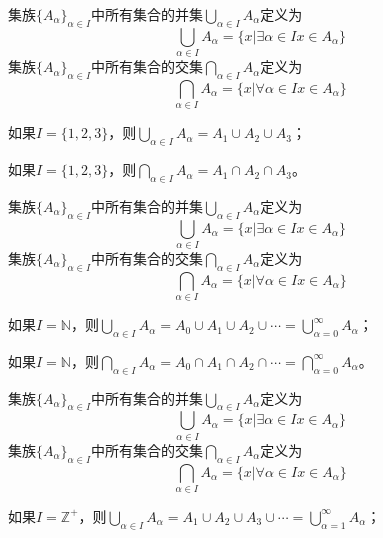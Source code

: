 \documentclass{beamer}
\begin{document}
\begin{CJK*}{UTF8}{gbsn}
\begin{frame}
  集族$\{A_{\alpha}\}_{\alpha \in I}$中所有集合的并集$\bigcup_{\alpha \in I}A_{\alpha}$定义为
  \[ \bigcup_{\alpha \in I}A_{\alpha} = \{x|\exists \alpha \in I  x \in A_{\alpha}\}\]
      集族$\{A_{\alpha}\}_{\alpha \in I}$中所有集合的交集$\bigcap_{\alpha \in I}A_{\alpha}$定义为
  \[ \bigcap_{\alpha \in I}A_{\alpha} = \{x|\forall \alpha \in I x \in A_{\alpha}\}\]
\pause
  \begin{Ex}
    如果$I=\{1,2,3\}$，则$\bigcup_{\alpha \in I}A_{\alpha} =A_1\cup A_2\cup A_3$；

    如果$I=\{1,2,3\}$，则$\bigcap_{\alpha \in I}A_{\alpha} =A_1\cap A_2\cap A_3$。
  \end{Ex}
\end{frame}

\begin{frame}
  集族$\{A_{\alpha}\}_{\alpha \in I}$中所有集合的并集$\bigcup_{\alpha \in I}A_{\alpha}$定义为
  \[ \bigcup_{\alpha \in I}A_{\alpha} = \{x|\exists \alpha \in I  x \in A_{\alpha}\}\]
      集族$\{A_{\alpha}\}_{\alpha \in I}$中所有集合的交集$\bigcap_{\alpha \in I}A_{\alpha}$定义为
  \[ \bigcap_{\alpha \in I}A_{\alpha} = \{x|\forall \alpha \in I x \in A_{\alpha}\}\]
\pause
  \begin{Ex}
    如果$I=\mathbb{N}$，则$\bigcup_{\alpha \in I}A_{\alpha} =A_0\cup A_1\cup A_2\cup\cdots=\bigcup_{\alpha=0}^{\infty}A_{\alpha}$；
    
    如果$I=\mathbb{N}$，则$\bigcap_{\alpha \in I}A_{\alpha} =A_0\cap A_1\cap A_2\cap\cdots=\bigcap_{\alpha=0}^{\infty}A_{\alpha}$。
  \end{Ex}
\end{frame}
\begin{frame}
  集族$\{A_{\alpha}\}_{\alpha \in I}$中所有集合的并集$\bigcup_{\alpha \in I}A_{\alpha}$定义为
  \[ \bigcup_{\alpha \in I}A_{\alpha} = \{x|\exists \alpha \in I  x \in A_{\alpha}\}\]
      集族$\{A_{\alpha}\}_{\alpha \in I}$中所有集合的交集$\bigcap_{\alpha \in I}A_{\alpha}$定义为
  \[ \bigcap_{\alpha \in I}A_{\alpha} = \{x|\forall \alpha \in I x \in A_{\alpha}\}\]
  \begin{Ex}
    如果$I=\mathbb{Z}^+$，则$\bigcup_{\alpha \in I}A_{\alpha} =A_1\cup A_2\cup A_3\cup\cdots=\bigcup_{\alpha=1}^{\infty}A_{\alpha}$；
    

\end{Ex}
\end{frame}
\end{CJK*}
\end{document}
